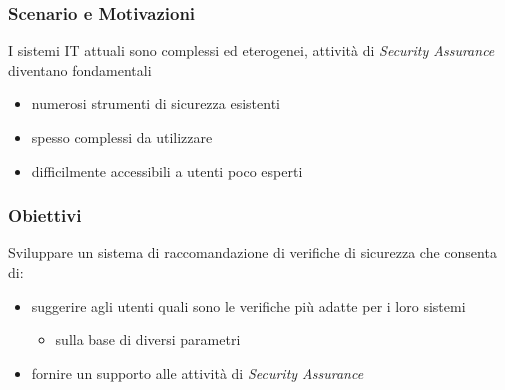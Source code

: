 \frame{\titlepage}

\begin{frame}
    \frametitle{Scenario e Motivazioni}
    I sistemi IT attuali sono \alert{complessi} ed \alert{eterogenei}, attività di \alert{\textit{Security Assurance}} diventano fondamentali 
    \begin{itemize}
        \item numerosi strumenti di sicurezza esistenti
        \item spesso \alert{complessi} da utilizzare
        \item difficilmente accessibili a utenti poco esperti
    \end{itemize}
\end{frame}

\begin{frame}
    \frametitle{Obiettivi}
    Sviluppare un \alert{sistema di raccomandazione} di \alert{verifiche di sicurezza} che consenta di:
    \begin{itemize}
        \item suggerire agli utenti quali sono le verifiche \alert{più adatte} per i loro sistemi
        \vspace{-0.4 cm}
        \begin{itemize}
            \item sulla base di diversi parametri
        \end{itemize}
        \item fornire un \alert{supporto} alle \alert{attività di \textit{Security Assurance}}
    \end{itemize}
\end{frame}

